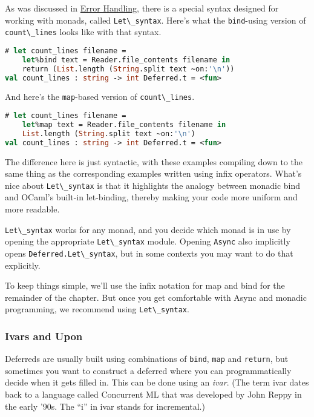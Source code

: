 As was discussed in
\href{error-handling.html\#bind-and-other-error-handling-idioms}{Error
Handling}, there is a special syntax designed for working with monads,
called \passthrough{\lstinline!Let\_syntax!}. Here's what the
\passthrough{\lstinline!bind!}-using version of
\passthrough{\lstinline!count\_lines!} looks like with that syntax.

\begin{lstlisting}[language=Caml]
# let count_lines filename =
    let%bind text = Reader.file_contents filename in
    return (List.length (String.split text ~on:'\n'))
val count_lines : string -> int Deferred.t = <fun>
\end{lstlisting}

And here's the \passthrough{\lstinline!map!}-based version of
\passthrough{\lstinline!count\_lines!}.

\begin{lstlisting}[language=Caml]
# let count_lines filename =
    let%map text = Reader.file_contents filename in
    List.length (String.split text ~on:'\n')
val count_lines : string -> int Deferred.t = <fun>
\end{lstlisting}

The difference here is just syntactic, with these examples compiling
down to the same thing as the corresponding examples written using infix
operators. What's nice about \passthrough{\lstinline!Let\_syntax!} is
that it highlights the analogy between monadic bind and OCaml's built-in
let-binding, thereby making your code more uniform and more readable.

\passthrough{\lstinline!Let\_syntax!} works for any monad, and you
decide which monad is in use by opening the appropriate
\passthrough{\lstinline!Let\_syntax!} module. Opening
\passthrough{\lstinline!Async!} also implicitly opens
\passthrough{\lstinline!Deferred.Let\_syntax!}, but in some contexts you
may want to do that explicitly.

To keep things simple, we'll use the infix notation for map and bind for
the remainder of the chapter. But once you get comfortable with Async
and monadic programming, we recommend using
\passthrough{\lstinline!Let\_syntax!}.

\hypertarget{ivars-and-upon}{%
\subsubsection{Ivars and Upon}\label{ivars-and-upon}}

Deferreds are usually built using combinations of
\passthrough{\lstinline!bind!}, \passthrough{\lstinline!map!} and
\passthrough{\lstinline!return!}, but sometimes you want to construct a
deferred where you can programmatically decide when it gets filled in.
This can be done using an \emph{ivar}. (The term ivar dates back to a
language called Concurrent ML that was developed by John Reppy in the
early '90s. The ``i'' in ivar stands for incremental.)

